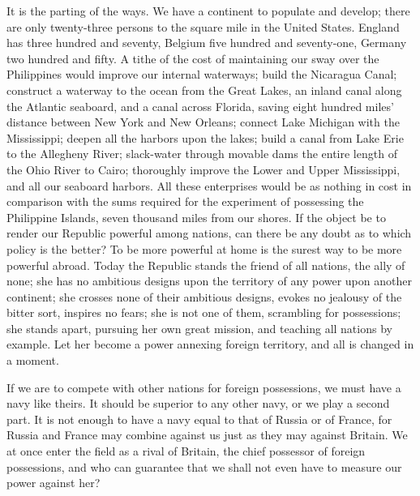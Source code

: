 \documentclass[11pt,openany]{book}
\begin{document}
It is the parting of the ways. We have a continent to populate and develop; there are only twenty-three persons to the square mile in the United States. England has three hundred and seventy, Belgium five hundred and seventy-one, Germany two hundred and fifty. A tithe of the cost of maintaining our sway over the Philippines would improve our internal waterways; build the Nicaragua Canal; construct a waterway to the ocean from the Great Lakes, an inland canal along the Atlantic seaboard, and a canal across Florida, saving eight hundred miles' distance between New York and New Orleans; connect Lake Michigan with the Mississippi; deepen all the harbors upon the lakes; build a canal from Lake Erie to the Allegheny River; slack-water through movable dams the entire length of the Ohio River to Cairo; thoroughly improve the Lower and Upper Mississippi, and all our seaboard harbors. All these enterprises would be as nothing in cost in comparison with the sums required for the experiment of possessing the Philippine Islands, seven thousand miles from our shores. If the object be to render our Republic powerful among nations, can there be any doubt as to which policy is the better? To be more powerful at home is the surest way to be more powerful abroad. Today the Republic stands the friend of all nations, the ally of none; she has no ambitious designs upon the territory of any power upon another continent; she crosses none of their ambitious designs, evokes no jealousy of the bitter sort, inspires no fears; she is not one of them, scrambling for possessions; she stands apart, pursuing her own great mission, and teaching all nations by example. Let her become a power annexing foreign territory, and all is changed in a moment.

If we are to compete with other nations for foreign possessions, we must have a navy like theirs. It should be superior to any other navy, or we play a second part. It is not enough to have a navy equal to that of Russia or of France, for Russia and France may combine against us just as they may against Britain. We at once enter the field as a rival of Britain, the chief possessor of foreign possessions, and who can guarantee that we shall not even have to measure our power against her?
\end{document}
